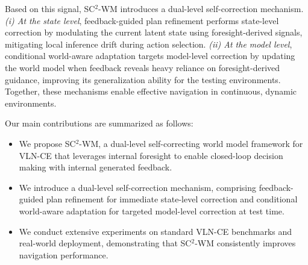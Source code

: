 \documentclass{article}
\theoremstyle{plain}
\theoremstyle{definition}
\theoremstyle{remark}
\begin{document}
Based on this signal, SC$^{2}$-WM introduces a dual-level self-correction mechanism.
\emph{(i) At the state level}, feedback-guided plan refinement performs state-level correction by modulating the current latent state using foresight-derived signals, mitigating local inference drift during action selection.
\emph{(ii) At the model level}, conditional world-aware adaptation targets model-level correction by updating the world model when feedback reveals heavy reliance on foresight-derived guidance, improving its generalization ability
for the testing environments.
Together, these mechanisms enable effective navigation in continuous, dynamic environments.

Our main contributions are summarized as follows:
\begin{itemize}
    \item We propose {SC$^{2}$-WM}, a dual-level self-correcting world model framework for VLN-CE that leverages internal foresight to enable closed-loop decision making with internal generated feedback.

    \item We introduce a {dual-level self-correction mechanism}, comprising {feedback-guided plan refinement} for immediate state-level correction and {conditional world-aware adaptation} for targeted model-level correction at test time.

    
    \item We conduct extensive experiments on standard VLN-CE benchmarks and real-world deployment, demonstrating that SC$^{2}$-WM consistently improves navigation performance.
\end{itemize}
\end{document}
